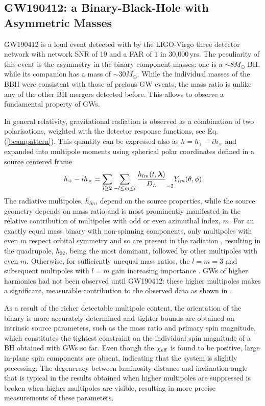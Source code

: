 \documentclass[binding=0.6cm, LaM]{sapthesis}
\begin{document}
\subsection{GW190412: a Binary-Black-Hole with Asymmetric Masses}
\label{subsec:GW1901412}
	GW190412 is a loud event detected with by the LIGO-Virgo three detector network 
	with network SNR of 19 and a FAR of 1 in 30,000\,yrs.
	The peculiarity of this event is the asymmetry in the binary component masses:
	one is a $\sim 8M_\odot$ BH, while its companion has a mass of $\sim 30M_\odot$.
	While the individual masses of the BBH were consistent with those of preious GW events,
	the mass ratio is unlike any of the other BH mergers detected before. 
	This allows to observe a fundamental property of GWs.

	In general relativity, gravitational radiation
	is observed as a combination of two polarisations, weighted with the detector response functions, see Eq.\,(\ref{beampattern}). 
	This quantity can be expressed also as $h = h_{+}-ih_{\times}$ and expanded into multipole moments 
	using spherical polar coordinates defined in a source centered frame \cite{133}
        \begin{equation}
          h_{+}-ih_{\times} = \sum_{l \geq 2} \sum_{-l \leq m \leq l} {{h_{lm}(t, \boldsymbol{\lambda})} \over {D_L}} _{-2} Y_{lm}(\theta, \phi)
        \end{equation}
	The radiative multipoles, $h_{lm}$, depend on the source properties, while the source geometry 
	depends on mass ratio and is most prominently manifested in the relative contribution 
	of multipoles with odd or even azimuthal index, $m$.
	For an exactly equal mass binary with non-spinning components, only multipoles with even $m$ 
	respect orbital symmetry and so are present in the radiation \cite{158}, resulting in the quadrupole, $h_{22}$, 
	being the most dominant, followed by other multipoles with even $m$. 
	Otherwise, for sufficiently unequal mass ratios, the $l = m = 3$ and subsequent 
	multipoles with $l = m$ gain increasing importance \cite{158, 159, 160}.
	GWs of higher harmonics had not been observed until GW190412:
	these higher multipoles makes a significant, measurable contribution to the observed data as shown in \cite{133}.

	As a result of the richer detectable multipole content, 
	the orientation of the binary is more accurately determined and 
	tighter bounds are obtained on intrinsic source parameters, 
	such as the mass ratio and primary spin magnitude, 
	which constitutes the tightest constraint on the individual spin magnitude of a BH obtained with GWs so far. 
	Even though the $\chi_{\rm eff}$ is found to be positive, 
	large in-plane spin components are absent, 
	indicating that the system is slightly precessing.
	The degeneracy between luminosity distance and inclination angle that is typical 
	in the results obtained when higher multipoles are suppressed is broken when higher multipoles are visible, 
	resulting in more precise measurements of these parameters.
\end{document}
